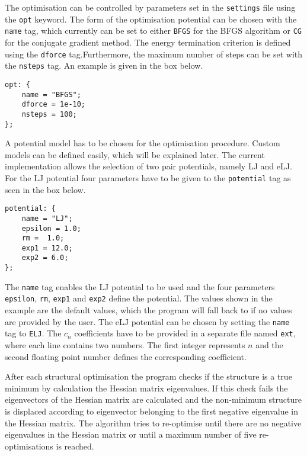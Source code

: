 The optimisation can be controlled by parameters set in the \texttt{settings}
file using the \texttt{opt} keyword. The form of the optimisation potential can
be chosen with the \texttt{name} tag, which currently can be set to either
\texttt{BFGS} for the \ac{BFGS} algorithm or \texttt{CG} for the conjugate
gradient method. The energy termination criterion is defined using the
\texttt{dforce} tag.Furthermore, the maximum number of steps can be set with
the \texttt{nsteps} tag. An example is given in the box below.
\newline
\begin{Verbatim}[frame=single,label=settings file - opt tag]
opt: {
    name = "BFGS";
    dforce = 1e-10;
    nsteps = 100;
};
\end{Verbatim}
%
A potential model has to be chosen for the optimisation procedure. Custom
models can be defined easily, which will be explained later. The current
implementation allows the selection of two pair potentials, namely \ac{LJ} and
\ac{eLJ}. For the \ac{LJ} potential four parameters have to be given to the
\texttt{potential} tag as seen in the box below.
%
\begin{Verbatim}[frame=single,label=settings file - potential tag]
potential: {
    name = "LJ";
    epsilon = 1.0;
    rm =  1.0;
    exp1 = 12.0;
    exp2 = 6.0;
};
\end{Verbatim}
%
The \texttt{name} tag enables the \ac{LJ} potential to be used and the four
parameters \texttt{epsilon}, \texttt{rm}, \texttt{exp1} and \texttt{exp2}
define the potential. The values shown in the example are the default values,
which the program will fall back to if no values are provided by the user. The
\ac{eLJ} potential can be chosen by setting the \texttt{name} tag to
\texttt{ELJ}. The $c_n$ coefficients have to be provided in a separate file
named \texttt{ext}, where each line contains two numbers. The first integer
represents $n$ and the second floating point number defines the corresponding
coefficient.

After each structural optimisation the program checks if the structure is a
true minimum by calculation the Hessian matrix eigenvalues. If this check fails
the eigenvectors of the Hessian matrix are calculated and the non-minimum
structure is displaced according to eigenvector belonging to the first negative
eigenvalue in the Hessian matrix. The algorithm tries to re-optimise until
there are no negative eigenvalues in the Hessian matrix or until a maximum
number of five re-optimisations is reached.

